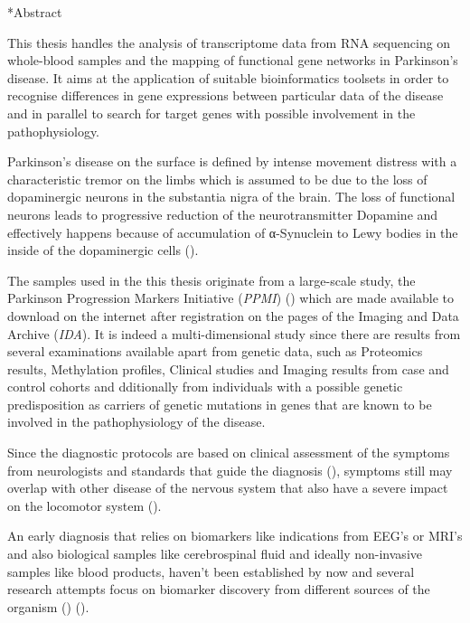\documentclass[12pt]{report}
\makeatletter
\let\oldchapter\chapter
\renewcommand{\chapter}{\@ifstar{\starchapter}{\nostarchapter}}
\newcommand{\starchapter}[1]{\oldchapter*{#1}\thispagestyle{mainstyle}}
\newcommand{\nostarchapter}[1]{\oldchapter{#1}\thispagestyle{mainstyle}}
\makeatother
\begin{document}
    \chapter*{Abstract}
            \par
                This thesis handles the analysis of transcriptome data from RNA sequencing on whole-blood samples and the mapping of functional gene networks in Parkinson's disease. It aims at the application of suitable bioinformatics toolsets in order to recognise differences in gene expressions between particular data of the disease and in parallel to search for target genes with possible involvement in the pathophysiology.
            \par
                Parkinson's disease on the surface is defined by intense movement distress with a characteristic tremor on the limbs which is assumed to be due to the loss of dopaminergic neurons in the substantia nigra of the brain. The loss of functional neurons leads to progressive reduction of the neurotransmitter Dopamine and effectively happens because of accumulation of α-Synuclein to Lewy bodies in the inside of the dopaminergic cells (\emph{\cite{Balestrino2020ParkinsonDisease}}).
            \par
                The samples used in the this thesis originate from a large-scale study, the Parkinson Progression Markers Initiative (\emph{PPMI}) (\emph{\cite{Marek2011ThePPMI}}) which are made available to download on the internet after registration on the pages of the Imaging and Data Archive (\emph{IDA}). It is indeed a multi-dimensional study since there are results from several examinations available apart from genetic data, such as Proteomics results, Methylation profiles, Clinical studies and Imaging results from case and control cohorts and dditionally from individuals with a possible genetic predisposition as carriers of genetic mutations in genes that are known to be involved in the pathophysiology of the disease.
            \par
                Since the diagnostic protocols are based on clinical assessment of the symptoms from neurologists and standards that guide the diagnosis (\emph{\cite{Koller2018TableGuidelines}}), symptoms still may overlap with other disease of the nervous system that also have a severe impact on the locomotor system (\emph{\cite{Tolosa2021ChallengesDisease}}).
            \par
                An early diagnosis that relies on biomarkers like indications from EEG's or MRI's and also biological samples like cerebrospinal fluid and ideally non-invasive samples like blood products, haven't been established by now and several research attempts focus on biomarker discovery from different sources of the organism (\emph{\cite{Miller2015BiomarkersFuture}}) (\emph{\cite{Maitin2022SurveyReview}}).
\end{document}
